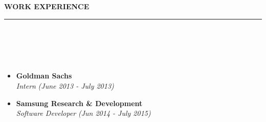 \documentclass[a4paper,10pt]{article}
\newcommand{\lsep}{-0.5cm}
\newcommand{\resheading}[1]{{\small
        {
            \begin{minipage}
                {0.975\textwidth}\textbf{{\textsc{#1 \vphantom{p\^{E}} }}}
                \\[-0.3cm]
                \hrule
            \end{minipage}
            \\[-0.5cm]
        }
 }}
\begin{document}
{{{
\hspace{0.5cm}\\
\hspace{0.5cm}\\
\hspace{0.5cm}\\
\hspace{0.5cm}\\
\hspace{0.5cm}\\
\hspace{0.5cm}\\
\hspace{0.5cm}\\
\hspace{0.5cm}\\
\hspace{0.5cm}\\
\hspace{0.5cm}\\[-0.3cm]
}}}

\resheading{\textbf{\large WORK EXPERIENCE}}\\[\lsep] \\[-0.4cm]
\begin{itemize}
\item \textbf{Goldman Sachs}  \\
    \emph{Intern} \hfill {\emph{(June 2013 - July 2013)}}
    \\[-0.6cm]

\item \textbf{Samsung Research \& Development} \\
    \emph{Software Developer}
    \hfill {\emph{(Jun 2014 - July 2015)}}
    \\ [-0.6cm]
\end{itemize}
\vspace{0.1cm}
\end{document}
